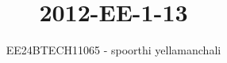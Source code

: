 \documentclass[journal]{IEEEtran}
\begin{document}

\vspace{3cm}

\title{2012-EE-1-13}
\author{EE24BTECH11065 - spoorthi yellamanchali}
{\let\newpage\relax\maketitle}

\renewcommand{\thefigure}{\theenumi}
\renewcommand{\thetable}{\theenumi}
\setlength{\intextsep}{10pt} %


\renewcommand{\thetable}{\theenumi}
\end{document}
